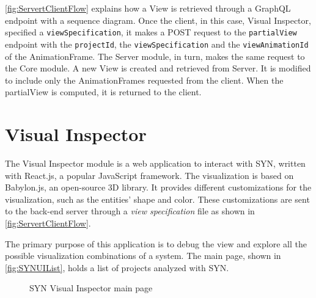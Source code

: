 \autoref{fig:ServertClientFlow} explains how a View is retrieved through a GraphQL endpoint with a sequence diagram. Once the client, in this case, Visual Inspector, specified a \texttt{viewSpecification}, it makes a POST request to the 
\texttt{partialView} endpoint with the \texttt{projectId}, the \texttt{viewSpecification} and the \texttt{viewAnimationId} of the AnimationFrame. The Server module, in turn, makes the same request to the Core module. A new View is created and retrieved from Server. It is modified to include only the AnimationFrames requested from the client. When the partialView is computed, it is returned to the client. 

\newpage
\section{Visual Inspector}
\label{s:SYNDebugger}

The Visual Inspector module is a web application to interact with SYN, written with React.js, a popular JavaScript framework. 
The visualization is based on Babylon.js, an open-source 3D library. 
It provides different customizations for the visualization, such as the entities' shape and color. 
These customizations are sent to the back-end server through a {\em view specification} file as shown in \autoref{fig:ServertClientFlow}. 

The primary purpose of this application is to debug the view and explore all the possible visualization combinations of a system.
The main page, shown in \autoref{fig:SYNUIList}, holds a list of projects analyzed with SYN.

\begin{figure}[h]
    \center
    \caption{SYN Visual Inspector main page}
    \label{fig:SYNUIList}
\end{figure}

